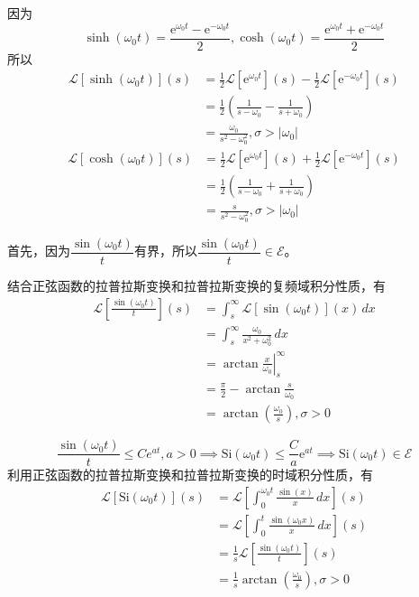 \documentclass{ctexbook}
\newcommand{\evalat}[3]{\left.#1\right|_{#2}^{#3}}
\begin{document}
\begin{example}[双曲函数]
    因为
    \[\sinh(\omega_0 t)=\frac{\mathrm{e}^{\omega_0 t}-\mathrm{e}^{-\omega_0 t}}{2},\cosh(\omega_0 t)=\frac{\mathrm{e}^{\omega_0 t}+\mathrm{e}^{-\omega_0 t}}{2}\]
    所以
    \begin{align*}
        \mathcal{L} \left[\sinh(\omega_0 t)\right](s)&=\frac{1}{2}\mathcal{L} \left[\mathrm{e}^{\omega_0 t}\right](s)-\frac{1}{2}\mathcal{L} \left[\mathrm{e}^{-\omega_0 t}\right](s)\\
        &=\frac{1}{2}\left(\frac{1}{s-\omega_0}-\frac{1}{s+\omega_0}\right)\\
        &=\frac{\omega_0}{s^2-\omega_0^2},\sigma>|\omega_0|
    \end{align*}
    \begin{align*}
        \mathcal{L} \left[\cosh(\omega_0 t)\right](s)&=\frac{1}{2}\mathcal{L} \left[\mathrm{e}^{\omega_0 t}\right](s)+\frac{1}{2}\mathcal{L} \left[\mathrm{e}^{-\omega_0 t}\right](s)\\
        &=\frac{1}{2}\left(\frac{1}{s-\omega_0}+\frac{1}{s+\omega_0}\right)\\
        &=\frac{s}{s^2-\omega_0^2},\sigma>|\omega_0|
    \end{align*}
\end{example}

\begin{example}[采样函数]
    首先，因为$\dfrac{\sin(\omega_0 t)}{t}$有界，所以$\dfrac{\sin(\omega_0 t)}{t}\in\mathcal{E}$。

    结合正弦函数的拉普拉斯变换和拉普拉斯变换的复频域积分性质，有
    \begin{align*}
        \mathcal{L} \left[\frac{\sin(\omega_0 t)}{t}\right](s)&=\int_s^{\infty}\mathcal{L}[\sin(\omega_0 t)](x)\,dx\\
        &=\int_s^{\infty}\frac{\omega_0}{x^2+\omega_0^2}\,dx\\
        &=\evalat{\arctan\frac{x}{\omega_0}}{s}{\infty}\\
        &=\frac{\pi}{2}-\arctan\frac{s}{\omega_0}\\
        &=\arctan\left(\frac{\omega_0}{s}\right),\sigma>0
    \end{align*}
\end{example}

\begin{example}[正弦积分函数]
    $$\frac{\sin(\omega_0 t)}{t}\leq Ce^{a t},a>0\implies \text{Si}(\omega_0 t)\leq \frac{C}{a}\mathrm{e}^{a t}\implies \text{Si}(\omega_0 t)\in\mathcal{E}$$
    利用正弦函数的拉普拉斯变换和拉普拉斯变换的时域积分性质，有
    \begin{align*}
        \mathcal{L} [\text{Si}(\omega_0 t)](s)&=\mathcal{L} \left[\int_0^{\omega_0 t} \frac{\sin(x)}{x}\,dx\right](s)\\
        &=\mathcal{L} \left[\int_0^{t} \frac{\sin(\omega_0 x)}{x}\,dx\right](s)\\
        &=\frac{1}{s}\mathcal{L} \left[\frac{\sin(\omega_0 t)}{t}\right](s)\\
        &=\frac{1}{s}\arctan\left(\frac{\omega_0}{s}\right),\sigma>0
    \end{align*}    
\end{example}
\end{document}
